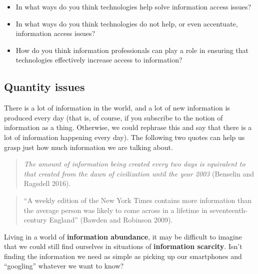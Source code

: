 \documentclass[
  letterpaper,
  DIV=11,
  numbers=noendperiod]{scrreprt}
\begin{document}
\begin{tcolorbox}[enhanced jigsaw, arc=.35mm, bottomrule=.15mm, bottomtitle=1mm, breakable, colback=white, colbacktitle=quarto-callout-tip-color!10!white, colframe=quarto-callout-tip-color-frame, coltitle=black, left=2mm, leftrule=.75mm, opacityback=0, opacitybacktitle=0.6, rightrule=.15mm, title=\textcolor{quarto-callout-tip-color}{\faLightbulb}\hspace{0.5em}{Pause and reflect}, titlerule=0mm, toprule=.15mm, toptitle=1mm]

\begin{itemize}
\item
  In what ways do you think technologies help solve information access
  issues?
\item
  In what ways do you think technologies do not help, or even
  accentuate, information access issues?
\item
  How do you think information professionals can play a role in ensuring
  that technologies effectively increase access to information?
\end{itemize}

\end{tcolorbox}

\subsection{Quantity issues}\label{quantity-issues}

There is a lot of information in the world, and a lot of new information
is produced every day (that is, of course, if you subscribe to the
notion of information as a thing. Otherwise, we could rephrase this and
say that there is a lot of information happening every day). The
following two quotes can help us grasp just how much information we are
talking about.

\begin{quote}
\emph{The amount of information being created every two days is
equivalent to that created from the dawn of civilization until the year
2003} (Benselin and Ragsdell 2016).
\end{quote}

\begin{quote}
``A weekly edition of the New York Times contains more information than
the average person was likely to come across in a lifetime in
seventeenth-century England'' (Bawden and Robinson 2009).
\end{quote}

Living in a world of \textbf{information abundance}, it may be difficult
to imagine that we could still find ourselves in situations of
\textbf{information scarcity}. Isn't finding the information we need as
simple as picking up our smartphones and ``googling'' whatever we want
to know?
\end{document}
